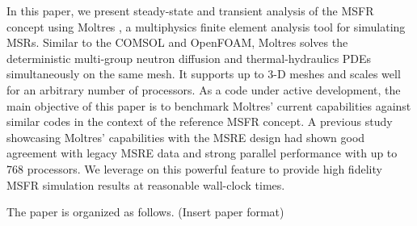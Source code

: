 In this paper, we present steady-state and transient analysis of the
\gls{MSFR} concept using Moltres \cite{lindsay_introduction_2018}, a
multiphysics finite element analysis tool
for simulating \glspl{MSR}. Similar to the COMSOL and OpenFOAM, Moltres
solves the deterministic multi-group neutron diffusion and thermal-hydraulics
\glspl{PDE} simultaneously on the same mesh. It supports up to 3-D meshes and
scales well for an arbitrary number of processors. As a code under active
development, the main objective of this paper is to benchmark Moltres' current
capabilities against similar codes in the context of the reference
\gls{MSFR} concept. A previous study \cite{lindsay_introduction_2018}
showcasing Moltres' capabilities with
the \gls{MSRE} design had shown good agreement with legacy
\gls{MSRE} data and strong parallel performance with up to 768 processors.
We leverage on this powerful feature to provide high fidelity \gls{MSFR}
simulation results at reasonable wall-clock times.

The paper is organized as follows. (Insert paper format)
